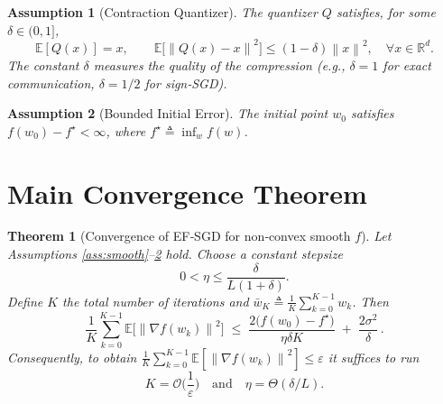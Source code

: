 \documentclass{article}
\newcommand{\E}{\mathbb{E}}
\newcommand{\R}{\mathbb{R}}
\newcommand{\norm}[1]{\left\|#1\right\|}
\newtheorem{assumption}{Assumption}
\newtheorem{theorem}{Theorem}
\begin{document}
\begin{assumption}[Contraction Quantizer]\label{ass:quant}
The quantizer $Q$ satisfies, for some $\delta\in(0,1]$,
\[
\E[Q(x)]=x,\qquad 
\E\!\big[\norm{Q(x)-x}^2\big]\le (1-\delta)\norm{x}^2,\quad\forall x\in\R^{d}.
\]
The constant $\delta$ measures the quality of the compression (e.g., $\delta=1$ for exact communication, $\delta=1/2$ for sign‑SGD).
\end{assumption}

\begin{assumption}[Bounded Initial Error]\label{ass:init}
The initial point $w_0$ satisfies $f(w_0)-f^\star <\infty$, where $f^\star\triangleq\inf_w f(w)$.
\end{assumption}

\section*{Main Convergence Theorem}
\begin{theorem}[Convergence of EF‑SGD for non‑convex smooth $f$]\label{thm:main}
Let Assumptions \ref{ass:smooth}–\ref{ass:init} hold. Choose a constant stepsize
\[
0<\eta\le \frac{\delta}{L(1+\delta)} .
\]
Define $K$ the total number of iterations and $\bar w_K\triangleq\frac1K\sum_{k=0}^{K-1}w_k$. Then
\[
\frac1K\sum_{k=0}^{K-1}\E\!\big[\norm{\nabla f(w_k)}^2\big]
\;\le\;
\frac{2\big(f(w_0)-f^\star\big)}{\eta\delta K}
\;+\;
\frac{2\sigma^2}{\delta}\, .
\tag{1}
\]
Consequently, to obtain $\frac1K\sum_{k=0}^{K-1}\E[\norm{\nabla f(w_k)}^2]\le\varepsilon$ it suffices to run
\[
K = \mathcal O\!\Big(\frac{1}{\varepsilon}\Big)
\quad\text{and}\quad
\eta = \Theta(\delta/L).
\]
\end{theorem}
\end{document}

